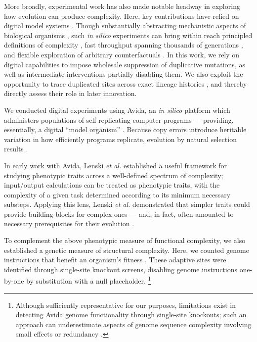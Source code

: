 More broadly, experimental work has also made notable headway in exploring how evolution can produce complexity.
Here, key contributions have relied on digital model systems \citep{Fortuna2022,Adami2000Evolution,Zaman2014Coevolution,Fortuna2017GenotypePhenotype}.
Though substantially abstracting mechanistic aspects of biological organisms \citep{peck2004simulation}, such \textit{in silico} experiments can bring within reach principled definitions of complexity \citep{Adami2002}, fast throughput spanning thousands of generations \citep{moreno2024trackable}, and flexible exploration of arbitrary counterfactuals \citep{langton1989artificial}.
In this work, we rely on digital capabilities to impose wholesale suppression of duplicative mutations, as well as intermediate interventions partially disabling them.
We also exploit the opportunity to trace duplicated sites across exact lineage histories \citep{dolson2024phylotrack}, and thereby directly assess their role in later innovation.



We conducted digital experiments using Avida, an \textit{in silico} platform which administers populations of self-replicating computer programs --- providing, essentially, a digital ``model organism'' \citep{Ofria:2009avida}.
Because copy errors introduce heritable variation in how efficiently programs replicate, evolution by natural selection results \citep{pennock2007models}.

In early work with Avida, Lenski \textit{et al.} established a useful framework for studying phenotypic traits across a well-defined spectrum of complexity;
input/output calculations can be treated as phenotypic traits, with the complexity of a given task determined according to its minimum necessary substeps.
Applying this lens, Lenski \textit{et al.} demonstrated that simpler traits could provide building blocks for complex ones --- and, in fact, often amounted to necessary prerequisites for their evolution \citep{Lenski2003Evolutionary}.

To complement the above phenotypic measure of functional complexity, we also established a genetic measure of structural complexity.
Here, we counted genome instructions that benefit an organism's fitness \citep{Adami2002}.
These adaptive sites were identified through single-site knockout screens, disabling genome instructions one-by-one by substitution with a null placeholder.
\unskip\footnote{%
Although sufficiently representative for our purposes, limitations exist in detecting Avida genome functionality through single-site knockouts; such an approach can underestimate aspects of genome sequence complexity involving small effects or redundancy \citep{Lenski1999,moreno2024cryptic}.
}

